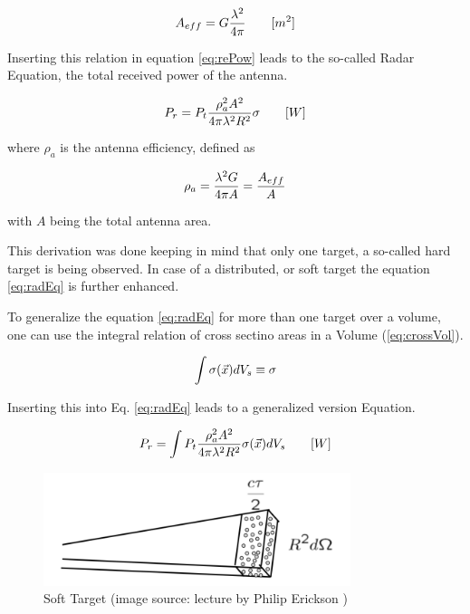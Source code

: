 \begin{equation}
\label{eq:Aeff}
	\centering
	A_{eff} = G \frac{\lambda^2}{4\pi} \qquad [m^2]
\end{equation}

Inserting this relation in equation \ref{eq:rePow} leads to the so-called Radar Equation, the total received power of the antenna.

\begin{equation}
\label{eq:radEq}
	\centering
	P_{r} = P_t \frac{\rho_a^2 A^2 }{4 \pi \lambda^2 R^2} \sigma \qquad [W]
\end{equation}

where $\rho_{a} $ is the antenna efficiency, defined as

\begin{equation}
\label{eq:effi}
	\centering
	\rho_a = \frac{\lambda^2 G }{4 \pi A} = \frac{A_{eff}}{A}
\end{equation}

with $A$ being the total antenna area.

This derivation was done keeping in mind that only one target, a so-called hard target is being observed. In case of a distributed, or soft target the equation \ref{eq:radEq} is further enhanced.

To generalize the equation \ref{eq:radEq} for more than one target over a volume, one can use the integral relation of cross sectino areas in a Volume (\ref{eq:crossVol}).

\begin{equation}
	\label{eq:crossVol}
	\centering
	\int \sigma(\vec{x}) dV_s \equiv \sigma
\end{equation}

Inserting this into Eq. \ref{eq:radEq} leads to a generalized version Equation.

\begin{equation}
\label{eq:radEqGen}
	\centering
	P_{r} = \int P_t \frac{\rho_a^2 A^2 }{4 \pi \lambda^2 R^2} \sigma(\vec{x}) dV_s \qquad [W]
\end{equation}


\begin{figure}
	\centering
	\label{fig:softTarget}
	\includegraphics[width=0.8\textwidth]{images/softTarget}
	\caption{Soft Target (image source: lecture by Philip Erickson \citep{erickson:lecture})}
\end{figure}

